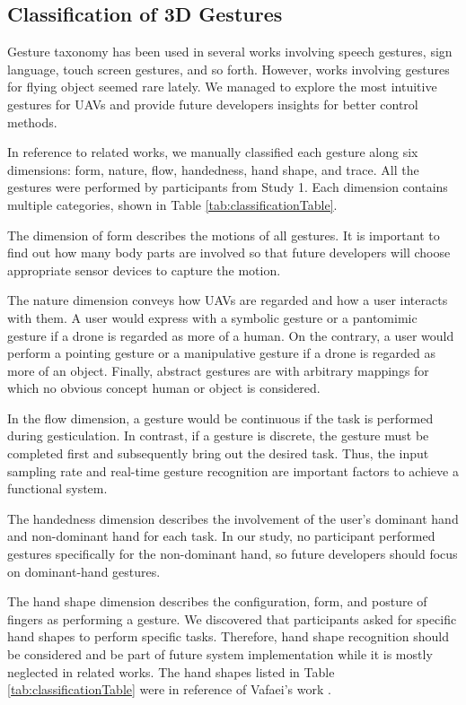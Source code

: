 \documentclass{sigchi}
\begin{document}
\subsection{Classification of 3D Gestures}
Gesture taxonomy has been used in several works involving speech gestures, sign language, touch screen gestures, and so forth. However, works involving gestures for flying object seemed rare lately. We managed to explore the most intuitive gestures for UAVs and provide future developers insights for better control methods.

In reference to related works, we manually classified each gesture along six dimensions: form, nature, flow, handedness, hand shape, and trace. All the gestures were performed by participants from Study 1. Each dimension contains multiple categories, shown in Table \ref{tab:classificationTable}.

The dimension of form describes the motions of all gestures. It is important to find out how many body parts are involved so that future developers will choose appropriate sensor devices to capture the motion.

The nature dimension conveys how UAVs are regarded and how a user interacts with them. A user would express with a symbolic gesture or a pantomimic gesture if a drone is regarded as more of a human. On the contrary, a user would perform a pointing gesture or a manipulative gesture if a drone is regarded as more of an object. Finally, abstract gestures are with arbitrary mappings for which no obvious concept human or object is considered.

In the flow dimension, a gesture would be continuous if the task is performed during gesticulation. In contrast, if a gesture is discrete, the gesture must be completed first and subsequently bring out the desired task. Thus, the input sampling rate and real-time gesture recognition are important factors to achieve a functional system.

The handedness dimension describes the involvement of the user's dominant hand and non-dominant hand for each task. In our study, no participant performed gestures specifically for the non-dominant hand, so future developers should focus on dominant-hand gestures.

The hand shape dimension describes the configuration, form, and posture of fingers as performing a gesture. We discovered that participants asked for specific hand shapes to perform specific tasks. Therefore, hand shape recognition should be considered and be part of future system implementation while it is mostly neglected in related works. The hand shapes listed in Table \ref{tab:classificationTable} were in reference of Vafaei's work \cite{Vafaei:2013}.
\end{document}
